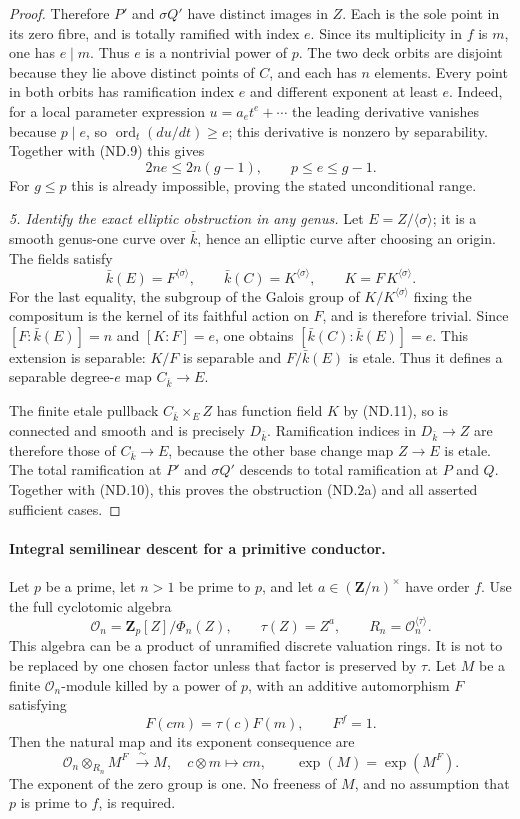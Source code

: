 \documentclass[11pt,a4paper]{article}
\begin{document}
\begin{proof}
Therefore $P'$ and $\sigma Q'$ have distinct images in $Z$.
Each is the sole point in its zero fibre, and is totally
ramified with index $e$. Since its multiplicity in $f$ is $m$,
one has $e\mid m$. Thus $e$ is a nontrivial power of $p$.
The two deck orbits are disjoint because they lie above distinct
points of $C$, and each has $n$ elements. Every point in both
orbits has ramification index $e$ and different exponent at
least $e$. Indeed, for a local parameter expression
$u=a_et^e+\cdots$ the leading derivative vanishes because
$p\mid e$, so $\operatorname{ord}_t(du/dt)\ge e$; this derivative
is nonzero by separability. Together with (ND.9) this gives
\[
                   2ne\le2n(g-1),\qquad p\le e\le g-1.
 \tag{ND.10}
\]
For $g\le p$ this is already impossible, proving the stated
unconditional range.

\emph{5. Identify the exact elliptic obstruction in any genus.}
Let $E=Z/\langle\sigma\rangle$; it is a smooth genus-one
curve over $\bar k$, hence an elliptic curve after choosing
an origin. The fields satisfy
\[
 \bar k(E)=F^{\langle\sigma\rangle},\qquad
 \bar k(C)=K^{\langle\sigma\rangle},\qquad
 K=F\,K^{\langle\sigma\rangle}.
 \tag{ND.11}
\]
For the last equality, the subgroup of the Galois group of
$K/K^{\langle\sigma\rangle}$ fixing the compositum is the
kernel of its faithful action on $F$, and is therefore trivial.
Since $[F:\bar k(E)]=n$ and $[K:F]=e$, one obtains
$[\bar k(C):\bar k(E)]=e$. This extension is separable:
$K/F$ is separable and $F/\bar k(E)$ is etale. Thus it defines
a separable degree-$e$ map $C_{\bar k}\to E$.

The finite etale pullback $C_{\bar k}\times_E Z$ has function
field $K$ by (ND.11), so is connected and smooth and is precisely
$D_{\bar k}$. Ramification indices in $D_{\bar k}\to Z$ are
therefore those of $C_{\bar k}\to E$, because the other base
change map $Z\to E$ is etale. The total ramification at $P'$
and $\sigma Q'$ descends to total ramification at $P$ and $Q$.
Together with (ND.10), this proves the obstruction (ND.2a)
and all asserted sufficient cases.
\end{proof}

\paragraph{Integral semilinear descent for a primitive conductor.}
Let $p$ be a prime, let $n>1$ be prime to $p$, and let
$a\in(\mathbf Z/n)^\times$ have order
$f$.  Use the full cyclotomic algebra
\[
 \mathcal O_n=\mathbf Z_p[Z]/\Phi_n(Z),\qquad
 \tau(Z)=Z^a,\qquad R_n=\mathcal O_n^{\langle\tau\rangle}.
 \tag{SD.1}
\]
This algebra can be a product of unramified discrete valuation
rings.  It is not to be replaced by one chosen factor unless
that factor is preserved by $\tau$.
Let $M$ be a finite $\mathcal O_n$-module killed by a power of
$p$, with an additive automorphism $F$ satisfying
\[
 F(cm)=\tau(c)F(m),\qquad F^f=1.
 \tag{SD.2}
\]
Then the natural map and its exponent consequence are
\[
 \mathcal O_n\otimes_{R_n}M^F\ \xrightarrow{\ \sim\ } M,
 \quad c\otimes m\longmapsto cm,
 \qquad \exp(M)=\exp(M^F).
 \tag{SD.3}
\]
The exponent of the zero group is one.  No freeness of $M$,
and no assumption that $p$ is prime to $f$, is required.
\end{document}
